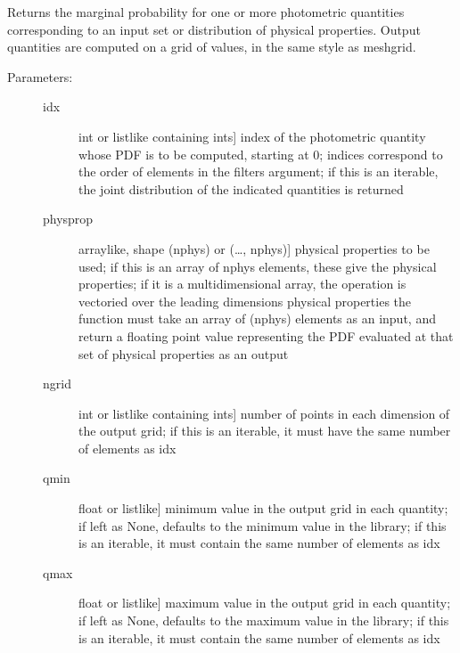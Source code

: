 \documentclass[letterpaper,10pt,english]{sphinxmanual}
\begin{document}
\begin{fulllineitems}
\begin{fulllineitems}
\label{\detokenize{cluster_slug:slugpy.cluster_slug.cluster_slug.mpdf_phot}}
Returns the marginal probability for one or more photometric
quantities corresponding to an input set or distribution of
physical properties. Output quantities are computed on a grid of
values, in the same style as meshgrid.
\begin{description}
\item[{Parameters:}] \leavevmode\begin{description}
\item[{idx}] \leavevmode{[}int or listlike containing ints{]}
index of the photometric quantity whose PDF is to be
computed, starting at 0; indices correspond to the order
of elements in the filters argument; if this is an
iterable, the joint distribution of the indicated
quantities is returned

\item[{physprop}] \leavevmode{[}arraylike, shape (nphys) or (…, nphys){]}
physical properties to be used; if this is an array of
nphys elements, these give the physical properties; if
it is a multidimensional array, the operation is
vectoried over the leading dimensions
physical properties \textendash{} the function must take an array
of (nphys) elements as an input, and return a floating
point value representing the PDF evaluated at that set
of physical properties as an output

\item[{ngrid}] \leavevmode{[}int or listlike containing ints{]}
number of points in each dimension of the output grid;
if this is an iterable, it must have the same number of
elements as idx

\item[{qmin}] \leavevmode{[}float or listlike{]}
minimum value in the output grid in each quantity; if
left as None, defaults to the minimum value in the
library; if this is an iterable, it must contain the
same number of elements as idx

\item[{qmax}] \leavevmode{[}float or listlike{]}
maximum value in the output grid in each quantity; if
left as None, defaults to the maximum value in the
library; if this is an iterable, it must contain the
same number of elements as idx


\end{description}
\end{description}
\end{fulllineitems}
\end{fulllineitems}
\end{document}
